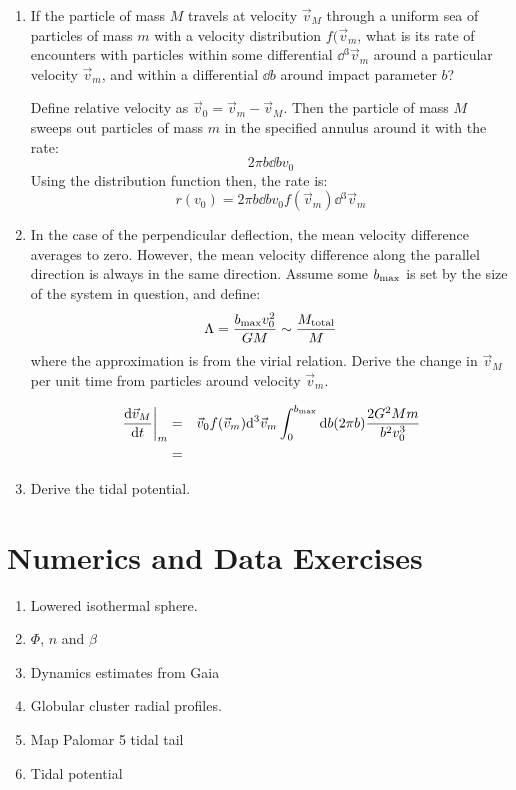 \begin{enumerate}
\begin{enumerate}
\item If the particle of mass $M$ travels at velocity $\vec{v}_M$
through a uniform sea of particles of mass $m$ with a velocity
distribution $f(\vec{v}_m$, what is its rate of encounters with
particles within some differential $\dd{}^3\vec{v}_m$ around a
particular velocity $\vec{v}_m$, and within a differential $\dd{b}$
around impact parameter $b$?
\begin{answer}
Define relative velocity as $\vec{v}_0 = \vec{v}_m - \vec{v}_M$. Then
the particle of mass $M$ sweeps out particles of mass $m$ in the
specified annulus around it with the rate:
\begin{equation}
2\pi b \dd{b} v_0
\end{equation}
Using the distribution function then, the rate is:
\begin{equation}
r(v_0) = 2\pi b \dd{b} v_0 f(\vec{v}_m)
\dd{}^3\vec{v}_m
\end{equation}
\end{answer}
\item In the case of the perpendicular deflection, the mean velocity
difference averages to zero. However, the mean velocity difference
along the parallel direction is always in the same direction. Assume
some $b_{\rm max}$ is set by the size of the system in question, and
define:
\begin{equation}
\Lambda = \frac{b_{\rm max}v_0^2}{GM} \sim \frac{M_{\rm total}}{M}
\end{equation}
where the approximation is from the virial relation. Derive the change
in $\vec{v}_M$ per unit time from particles around velocity
$\vec{v}_m$.
\begin{answer}
\begin{eqnarray}
\left.\frac{{\rm d}\vec{v}_M}{{\rm d}t} \right|_m  &=&
\vec{v}_0 f(\vec{v}_m) {\rm d}^3 \vec{v}_m
\int_0^{b_{\rm max}} {\rm d}b (2\pi b) \frac{2G^2Mm}{b^2 v_0^3} \cr
&=&
\end{eqnarray}
\end{answer}

\item Derive the tidal potential.
\end{enumerate}

\end{enumerate}

\section{Numerics and Data Exercises}

\begin{enumerate}
\item Lowered isothermal sphere.
\item $\Phi$, $n$ and $\beta$
\item Dynamics estimates from Gaia
\item Globular cluster radial profiles.
\item Map Palomar 5 tidal tail
\item Tidal potential
\end{enumerate}


  
